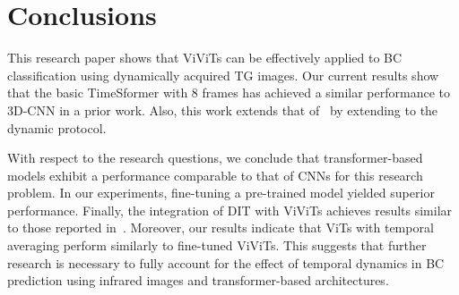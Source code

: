 \documentclass[runningheads]{llncs}
\begin{document}
\section{Conclusions}
\label{sec:conclusions}

This research paper shows that \ac{ViViTs} can be effectively applied
to \ac{BC} classification using dynamically acquired \ac{TG}
images. Our current results show that the basic TimeSformer with 8
frames has achieved a similar performance to 3D-CNN in a prior
work. Also, this work extends that of~\cite{Garia2023} by extending to
the dynamic protocol.

With respect to the research questions, we conclude that
transformer-based models exhibit a performance comparable to that of
\ac{CNNs} for this research problem. In our experiments, fine-tuning a
pre-trained model yielded superior performance. Finally, the
integration of \ac{DIT} with \ac{ViViTs} achieves results similar to
those reported in~\cite{Garia2023}. Moreover, our results indicate
that \ac{ViTs} with temporal averaging perform similarly to fine-tuned
\ac{ViViTs}. This suggests that further research is necessary to fully
account for the effect of temporal dynamics in \ac{BC} prediction
using infrared images and transformer-based architectures.




\end{document}
